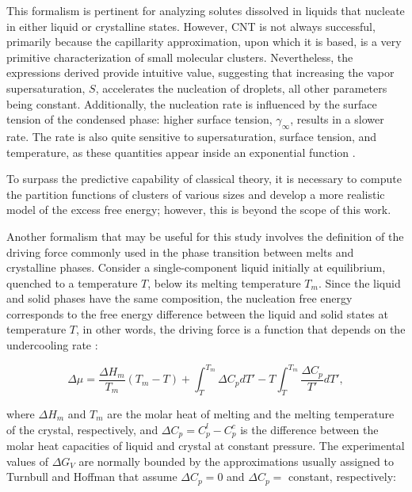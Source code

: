 This formalism is pertinent for analyzing solutes dissolved in liquids that nucleate in either liquid or crystalline states. However, CNT is not always successful, primarily because the capillarity approximation, upon which it is based, is a very primitive characterization of small molecular clusters. Nevertheless, the expressions derived provide intuitive value, suggesting that increasing the vapor supersaturation, \(S\), accelerates the nucleation of droplets, all other parameters being constant. Additionally, the nucleation rate is influenced by the surface tension of the condensed phase: higher surface tension, \(\gamma_{\infty}\), results in a slower rate. The rate is also quite sensitive to supersaturation, surface tension, and temperature, as these quantities appear inside an exponential function \cite{Ford}.

To surpass the predictive capability of classical theory, it is necessary to compute the partition functions of clusters of various sizes and develop a more realistic model of the excess free energy; however, this is beyond the scope of this work.

Another formalism that may be useful for this study involves the definition of the driving force commonly used in the phase transition between melts and crystalline phases. Consider a single-component liquid initially at equilibrium, quenched to a temperature \(T\), below its melting temperature \(T_m\). Since the liquid and solid phases have the same composition, the nucleation free energy corresponds to the free energy difference between the liquid and solid states at temperature \(T\), in other words, the driving force is a function that depends on the undercooling rate \cite{Clouet1, Fokin2006}:

\begin{equation}
    \Delta\mu = \frac{\Delta H_{m}}{T_{m}}(T_{m} - T) + \int_{T}^{T_{m}} \Delta C_{p} dT' - T \int_{T}^{T_{m}} \frac{\Delta C_{p}}{T'} dT',
\end{equation}

where \(\Delta H_{m}\) and \(T_{m}\) are the molar heat of melting and the melting temperature of the crystal, respectively, and \(\Delta C_{p} = C_{p}^{l} - C_{p}^{c}\) is the difference between the molar heat capacities of liquid and crystal at constant pressure. The experimental values of \(\Delta G_{V}\) are normally bounded by the approximations usually assigned to Turnbull and Hoffman that assume \(\Delta C_{p} = 0\) and \(\Delta C_{p} = \) constant, respectively:

